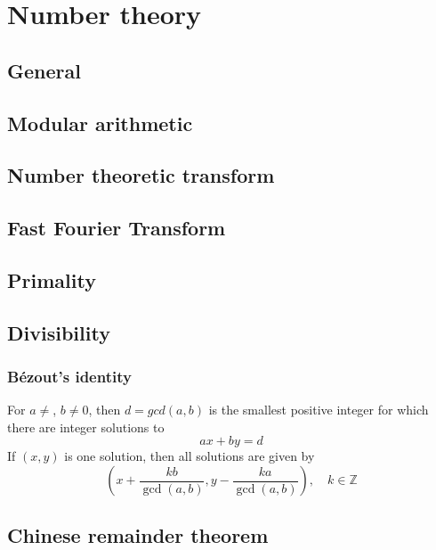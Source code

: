 \chapter{Number theory}

\section{General}

\section{Modular arithmetic}

\section{Number theoretic transform}

\section{Fast Fourier Transform}

\section{Primality}

\section{Divisibility}

	\subsection{Bézout's identity}
	For $a \neq $, $b \neq 0$, then $d=gcd(a,b)$ is the smallest positive integer for which there are integer solutions to
	$$ax+by=d$$
	If $(x,y)$ is one solution, then all solutions are given by
	$$\left(x+\frac{kb}{\gcd(a,b)}, y-\frac{ka}{\gcd(a,b)}\right), \quad k\in\mathbb{Z}$$


\section{Chinese remainder theorem}

